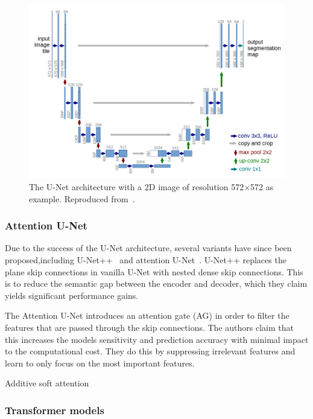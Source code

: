 \begin{figure}
    \centering
    \includegraphics[width=1\linewidth]{media/images/UNet_arch.png}
    \caption{The U-Net architecture with a 2D image of resolution 572$\times$572 as example. Reproduced from~\cite{Ronneberger_Fischer_Brox_2015}.}
    \label{fig:unet_arch}
  \end{figure}

\subsubsection{Attention U-Net}

Due to the success of the U-Net architecture, several variants have since been proposed,including U-Net++~\cite{Zhou_2018_unet++} and attention U-Net~\cite{Oktay_2018_AUNet}. U-Net++
replaces the plane skip connections in vanilla U-Net with nested dense skip connections. This is to reduce the semantic gap between the encoder and decoder, which they claim yields significant performance gains.

The Attention U-Net introduces an attention gate (AG) in order to filter the features that are passed through the skip connections. The authors claim that this increases the models sensitivity and prediction accuracy with minimal impact to the computational cost. They do this by suppressing irrelevant features and learn to only focus on the most important features. 

Additive soft attention

\subsubsection{Transformer models}


